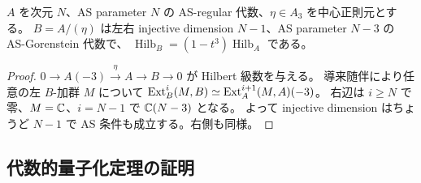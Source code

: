 \begin{lemma}\label{lem:pg-central-cubic}
$A$ を次元 $N$、AS parameter $N$ の AS-regular 代数、$\eta\in A_3$ を中心正則元とする。
$B=A/(\eta)$ は左右 injective dimension $N-1$、AS parameter $N-3$ の AS-Gorenstein 代数で、
$\operatorname{Hilb}_B=(1-t^3)\operatorname{Hilb}_A$ である。
\end{lemma}
\begin{proof}
$0\to A(-3)\xrightarrow{\eta}A\to B\to0$ が Hilbert 級数を与える。
導来随伴により任意の左 $B$-加群 $M$ について
$\operatorname{Ext}_B^i(M,B)\simeq\operatorname{Ext}_A^{i+1}(M,A)(-3)$。
右辺は $i\geq N$ で零、$M=\mathbb C$、$i=N-1$ で $\mathbb C(N-3)$ となる。
よって injective dimension はちょうど $N-1$ で AS 条件も成立する。右側も同様。
\end{proof}

\subsection{代数的量子化定理の証明}
